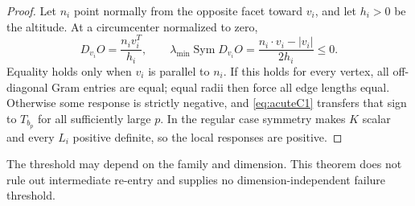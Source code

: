 \documentclass[11pt]{article}
\theoremstyle{definition}
\newcommand{\Sym}{\operatorname{Sym}}
\begin{document}
\begin{proof}
Let $n_i$ point normally from the opposite facet toward $v_i$, and let
$h_i>0$ be the altitude. At a circumcenter normalized to zero,
\[
 D_{v_i}O=\frac{n_iv_i^T}{h_i},\qquad
 \lambda_{\min}\Sym D_{v_i}O=\frac{n_i\cdot v_i-|v_i|}{2h_i}\le0.
\]
Equality holds only when $v_i$ is parallel to $n_i$. If this holds for
every vertex, all off-diagonal Gram entries are equal; equal radii then
force all edge lengths equal. Otherwise some response is strictly
negative, and \eqref{eq:acuteC1} transfers that sign to $T_{b_p}$ for all
sufficiently large $p$. In the regular case symmetry makes $K$ scalar
and every $L_i$ positive definite, so the local responses are positive.
\end{proof}
The threshold may depend on the family and dimension. This theorem does
not rule out intermediate re-entry and supplies no dimension-independent
failure threshold.
\end{document}
